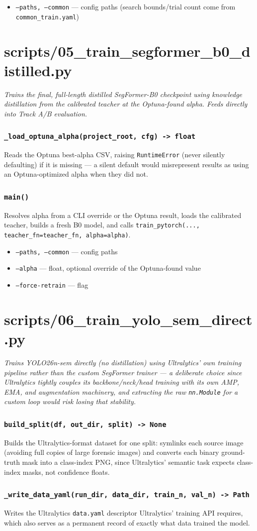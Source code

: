 \documentclass[11pt]{article}
\newcommand{\role}[1]{\par\noindent\textit{#1}\par\vspace{0.5em}}
\newcommand{\func}[1]{\subsubsection*{\texttt{#1}}}
\newcommand{\cliarg}[2]{\item \texttt{#1} --- #2}
\begin{document}
\begin{itemize}[nosep]
\cliarg{--paths, --common}{config paths (search bounds/trial count come from \texttt{common\_train.yaml})}
\end{itemize}

\section{scripts/05\_train\_segformer\_b0\_distilled.py}
\role{Trains the final, full-length distilled SegFormer-B0 checkpoint using
knowledge distillation from the calibrated teacher at the Optuna-found alpha.
Feeds directly into Track A/B evaluation.}

\func{\_load\_optuna\_alpha(project\_root, cfg) -> float}
Reads the Optuna best-alpha CSV, raising \texttt{RuntimeError} (never silently
defaulting) if it is missing --- a silent default would misrepresent results as
using an Optuna-optimized alpha when they did not.

\func{main()}
Resolves alpha from a CLI override or the Optuna result, loads the calibrated
teacher, builds a fresh B0 model, and calls
\texttt{train\_pytorch(..., teacher\_fn=teacher\_fn, alpha=alpha)}.

\begin{itemize}[nosep]
\cliarg{--paths, --common}{config paths}
\cliarg{--alpha}{float, optional override of the Optuna-found value}
\cliarg{--force-retrain}{flag}
\end{itemize}

\section{scripts/06\_train\_yolo\_sem\_direct.py}
\role{Trains YOLO26n-sem directly (no distillation) using Ultralytics' own
training pipeline rather than the custom SegFormer trainer --- a deliberate
choice since Ultralytics tightly couples its backbone/neck/head training with
its own AMP, EMA, and augmentation machinery, and extracting the raw
\texttt{nn.Module} for a custom loop would risk losing that stability.}

\func{build\_split(df, out\_dir, split) -> None}
Builds the Ultralytics-format dataset for one split: symlinks each source image
(avoiding full copies of large forensic images) and converts each binary
ground-truth mask into a class-index PNG, since Ultralytics' semantic task
expects class-index masks, not confidence floats.

\func{\_write\_data\_yaml(run\_dir, data\_dir, train\_n, val\_n) -> Path}
Writes the Ultralytics \texttt{data.yaml} descriptor Ultralytics' training API
requires, which also serves as a permanent record of exactly what data trained
the model.
\end{document}
